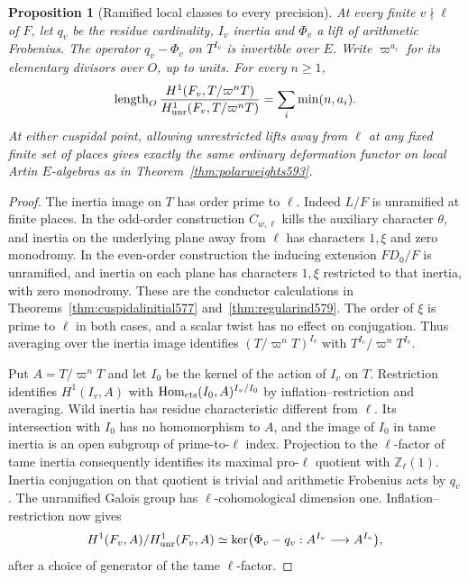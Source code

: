 \documentclass[a4paper,11pt]{article}
\newtheorem{proposition}{Proposition}[section]
\theoremstyle{definition}
\theoremstyle{remark}
\newcommand{\ZZ}{\mathbb Z}\newcommand{\ord}{\operatorname{ord}}
\numberwithin{equation}{section}
\begin{document}
\begin{proposition}[Ramified local classes to every precision]
\leavevmode\label{prop:tamerigid594}
At every finite \(v\nmid\ell\) of \(F\), let \(q_v\) be the
residue cardinality, \(I_v\) inertia and \(\Phi_v\) a lift of
arithmetic Frobenius. The operator \(q_v-\Phi_v\) on \(T^{I_v}\)
is invertible over \(E\). Write \(\varpi^{a_i}\) for its elementary
divisors over \(O\), up to units. For every \(n\ge1\),
\[
 \operatorname{length}_O
 \frac{H^1(F_v,T/\varpi^nT)}{H^1_{\rm unr}(F_v,T/\varpi^nT)}
       =\sum_i\min(n,a_i).
\]
At either cuspidal point, allowing unrestricted lifts away from
\(\ell\) at any fixed finite set of places gives exactly the same
ordinary deformation functor on local Artin \(E\)-algebras as in
Theorem~\ref{thm:polarweights593}.
\end{proposition}
\begin{proof}
The inertia image on \(T\) has order prime to \(\ell\).
Indeed \(L/F\) is unramified at finite places. In the odd-order
construction \(C_{w,\ell}\) kills the auxiliary character
\(\theta\), and inertia on the underlying plane away from
\(\ell\) has characters \(1,\xi\) and zero monodromy.
In the even-order construction the inducing extension
\(FD_0/F\) is unramified, and inertia on each plane has
characters \(1,\xi\) restricted to that inertia, with zero
monodromy. These are the conductor calculations in
Theorems~\ref{thm:cuspidalinitial577} and~\ref{thm:regularind579}.
The order of \(\xi\) is prime to \(\ell\) in both cases, and
a scalar twist has no effect on conjugation. Thus averaging
over the inertia image identifies \((T/\varpi^nT)^{I_v}\)
with \(T^{I_v}/\varpi^nT^{I_v}\).

Put \(A=T/\varpi^nT\) and let \(I_0\) be the kernel of the
action of \(I_v\) on \(T\). Restriction identifies \(H^1(I_v,A)\)
with \(\operatorname{Hom}_{\rm cts}(I_0,A)^{I_v/I_0}\) by
inflation--restriction and averaging. Wild inertia has residue
characteristic different from \(\ell\). Its intersection with
\(I_0\) has no homomorphism to \(A\), and the image of \(I_0\)
in tame inertia is an open subgroup of prime-to-\(\ell\) index.
Projection to the \(\ell\)-factor of tame inertia consequently
identifies its maximal pro-\(\ell\) quotient with \(\ZZ_\ell(1)\).
Inertia conjugation on that quotient is trivial and arithmetic
Frobenius acts by \(q_v\). The unramified Galois group has
\(\ell\)-cohomological dimension one. Inflation--restriction
now gives
\[
 H^1(F_v,A)/H^1_{\rm unr}(F_v,A)
   \simeq \ker\bigl(\Phi_v-q_v:A^{I_v}\longrightarrow A^{I_v}\bigr),
\]
after a choice of generator of the tame \(\ell\)-factor.


\end{proof}
\end{document}
